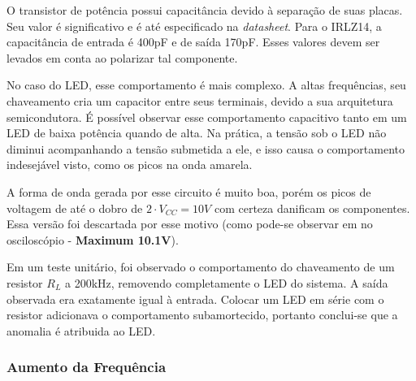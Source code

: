 	O transistor de potência possui capacitância devido à separação de suas placas. Seu valor é significativo e é até especificado na \textit{datasheet}. Para o IRLZ14, a capacitância de entrada é 400pF e de saída 170pF. Esses valores devem ser levados em conta ao polarizar tal componente.

	No caso do LED, esse comportamento é mais complexo. A altas frequências, seu chaveamento cria um capacitor entre seus terminais, devido a sua arquitetura semicondutora. É possível observar esse comportamento capacitivo tanto em um LED de baixa potência quando de alta. Na prática, a tensão sob o LED não diminui acompanhando a tensão submetida a ele, e isso causa o comportamento indesejável visto, como os picos na onda amarela.

	A forma de onda gerada por esse circuito é muito boa, porém os picos de voltagem de até o dobro de $2 \cdot V_{CC} = 10V$ com certeza danificam os componentes. Essa versão foi descartada por esse motivo (como pode-se observar em no osciloscópio - \textbf{Maximum 10.1V}).

	Em um teste unitário, foi observado o comportamento do chaveamento de um resistor $R_{L}$ a 200kHz, removendo completamente o LED do sistema. A saída observada era exatamente igual à entrada. Colocar um LED em série com o resistor adicionava o comportamento subamortecido, portanto conclui-se que a anomalia é atribuida ao LED.

	\subsubsection{Aumento da Frequência}

